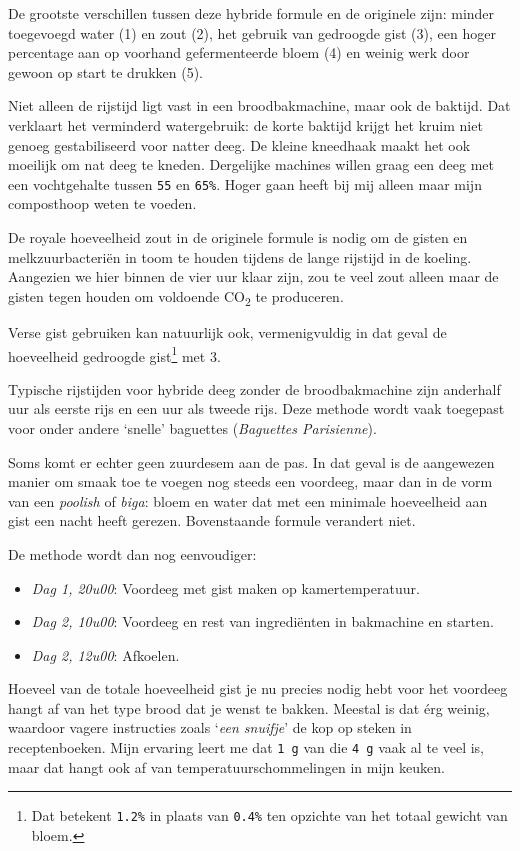 \documentclass[
  11pt,
  dutch,
]{memoir}
\providecommand{\tightlist}{%
  \setlength{\itemsep}{0pt}\setlength{\parskip}{0pt}}
\begin{document}
De grootste verschillen tussen deze hybride formule en de originele
zijn: minder toegevoegd water (1) en zout (2), het gebruik van gedroogde
gist (3), een hoger percentage aan op voorhand gefermenteerde bloem (4)
en weinig werk door gewoon op start te drukken (5).

Niet alleen de rijstijd ligt vast in een broodbakmachine, maar ook de
baktijd. Dat verklaart het verminderd watergebruik: de korte baktijd
krijgt het kruim niet genoeg gestabiliseerd voor natter deeg. De kleine
kneedhaak maakt het ook moeilijk om nat deeg te kneden. Dergelijke
machines willen graag een deeg met een vochtgehalte tussen \texttt{55}
en \texttt{65\%}. Hoger gaan heeft bij mij alleen maar mijn composthoop
weten te voeden.

De royale hoeveelheid zout in de originele formule is nodig om de gisten
en melkzuurbacteriën in toom te houden tijdens de lange rijstijd in de
koeling. Aangezien we hier binnen de vier uur klaar zijn, zou te veel
zout alleen maar de gisten tegen houden om voldoende CO\textsubscript{2}
te produceren.

Verse gist gebruiken kan natuurlijk ook, vermenigvuldig in dat geval de
hoeveelheid gedroogde gist\footnote{Dat betekent \texttt{1.2\%} in
  plaats van \texttt{0.4\%} ten opzichte van het totaal gewicht van
  bloem.} met 3.

Typische rijstijden voor hybride deeg zonder de broodbakmachine zijn
anderhalf uur als eerste rijs en een uur als tweede rijs. Deze methode
wordt vaak toegepast voor onder andere `snelle' baguettes
(\emph{Baguettes Parisienne}).

Soms komt er echter geen zuurdesem aan de pas. In dat geval is de
aangewezen manier om smaak toe te voegen nog steeds een voordeeg, maar
dan in de vorm van een \emph{poolish} of \emph{biga}: bloem en water dat
met een minimale hoeveelheid aan gist een nacht heeft gerezen.
Bovenstaande formule verandert niet.

De methode wordt dan nog eenvoudiger:

\begin{itemize}
\tightlist
\item
  \emph{Dag 1, 20u00}: Voordeeg met gist maken op kamertemperatuur.
\item
  \emph{Dag 2, 10u00}: Voordeeg en rest van ingrediënten in bakmachine
  en starten.
\item
  \emph{Dag 2, 12u00}: Afkoelen.
\end{itemize}

Hoeveel van de totale hoeveelheid gist je nu precies nodig hebt voor het
voordeeg hangt af van het type brood dat je wenst te bakken. Meestal is
dat érg weinig, waardoor vagere instructies zoals `\emph{een snuifje}'
de kop op steken in receptenboeken. Mijn ervaring leert me dat
\texttt{1\ g} van die \texttt{4\ g} vaak al te veel is, maar dat hangt
ook af van temperatuurschommelingen in mijn keuken.
\end{document}
